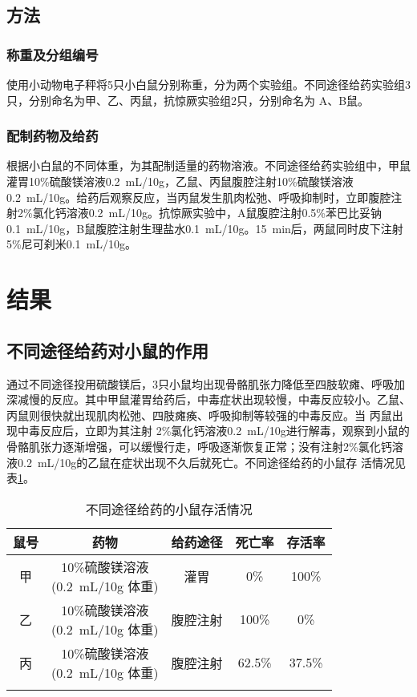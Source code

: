 \documentclass[lang=cn,11pt,a4paper,cite=super,AutoFakeBold,chinesefont=founder]{elegantpaper}
\begin{document}
\subsection{方法}

\subsubsection{称重及分组编号}

使用小动物电子秤将5只小白鼠分别称重，分为两个实验组。不同途径给药实验组3只，分别命名为甲、乙、丙鼠，抗惊厥实验组2只，分别命名为 A、B鼠。

\subsubsection{配制药物及给药}

根据小白鼠的不同体重，为其配制适量的药物溶液。不同途径给药实验组中，甲鼠灌胃10\%硫酸镁溶液\SI{0.2}{mL/10g}，乙鼠、丙鼠腹腔注射10\%硫酸镁溶液\SI{0.2}{mL/10g}。给药后观察反应，当丙鼠发生肌肉松弛、呼吸抑制时，立即腹腔注射2\%氯化钙溶液\SI{0.2}{mL/10g}。抗惊厥实验中，A鼠腹腔注射0.5\%苯巴比妥钠\SI{0.1}{mL/10g}，B鼠腹腔注射生理盐水\SI{0.1}{mL/10g}。\SI{15}{min}后，两鼠同时皮下注射5\%尼可刹米\SI{0.1}{mL/10g}。

\section{结果}

\subsection{不同途径给药对小鼠的作用}

通过不同途径投用硫酸镁后，3只小鼠均出现骨骼肌张力降低至四肢软瘫、呼吸加深减慢的反应。其中甲鼠灌胃给药后，中毒症状出现较慢，中毒反应较小。乙鼠、丙鼠则很快就出现肌肉松弛、四肢瘫痪、呼吸抑制等较强的中毒反应。当 丙鼠出现中毒反应后，立即为其注射 2\%氯化钙溶液\SI{0.2}{mL/10g}进行解毒，观察到小鼠的骨骼肌张力逐渐增强，可以缓慢行走，呼吸逐渐恢复正常；没有注射2\%氯化钙溶液\SI{0.2}{mL/10g}的乙鼠在症状出现不久后就死亡。不同途径给药的小鼠存 活情况见表\ref{tabular:1}。

\begin{table}[!ht]
\caption{不同途径给药的小鼠存活情况}
	\centering
	\begin{tabular}{*5{c}}
	\toprule
	鼠号 & 药物 & 给药途径 & 死亡率 & 存活率 \\
	\midrule
	甲 & \makecell[c]{10\%硫酸镁溶液 \\ (\SI{0.2}{mL/10g} 体重)} & 灌胃 	& 0\% 	& 100\% \\
	乙 & \makecell[c]{10\%硫酸镁溶液 \\ (\SI{0.2}{mL/10g} 体重)} & 腹腔注射 & 100\% & 0\% \\
	丙 & \makecell[c]{10\%硫酸镁溶液 \\ (\SI{0.2}{mL/10g} 体重)} & 腹腔注射 & 62.5\% & 37.5\% \\
	\bottomrule
	\label{tabular:1}
	\end{tabular}
\end{table}
\end{document}
